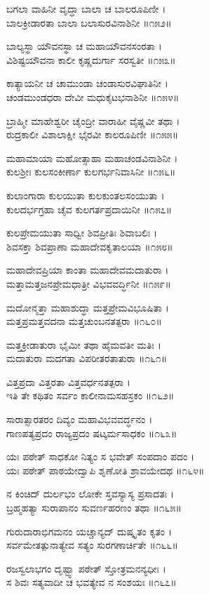 ಬಗಲಾ ವಾಹಿನೀ ವೃದ್ಧಾ ಬಾಲಾ ಚ ಬಾಲರೂಪಿಣೀ ।\\
ಬಾಲಕ್ರೀಡಾರತಾ ಬಾಲಾ ಬಲಾಸುರವಿನಾಶಿನೀ ॥೧೫೨॥

ಬಾಲ್ಯಸ್ಥಾ ಯೌವನಸ್ಥಾ ಚ ಮಹಾಯೌವನಸಂರತಾ ।\\
ವಿಶಿಷ್ಟಯೌವನಾ ಕಾಲೀ ಕೃಷ್ಣದುರ್ಗಾ ಸರಸ್ವತೀ ॥೧೫೩॥

ಕಾತ್ಯಾಯನೀ ಚ ಚಾಮುಂಡಾ ಚಂಡಾಸುರವಿಘಾತಿನೀ ।\\
ಚಂಡಮುಂಡಧರಾ ದೇವೀ ಮಧುಕೈಟಭನಾಶಿನೀ ॥೧೫೪॥

ಬ್ರಾಹ್ಮೀ ಮಾಹೇಶ್ವರೀ ಚೈಂದ್ರೀ ವಾರಾಹೀ ವೈಷ್ಣವೀ ತಥಾ ।\\
ರುದ್ರಕಾಲೀ ವಿಶಾಲಾಕ್ಷೀ ಭೈರವೀ ಕಾಲರೂಪಿಣೀ ॥೧೫೫॥

ಮಹಾಮಾಯಾ ಮಹೋತ್ಸಾಹಾ ಮಹಾಚಂಡವಿನಾಶಿನೀ ।\\
ಕುಲಶ್ರೀಃ ಕುಲಸಂಕೀರ್ಣಾ ಕುಲಗರ್ಭನಿವಾಸಿನೀ ॥೧೫೬॥

ಕುಲಾಂಗಾರಾ ಕುಲಯುತಾ ಕುಲಕುಂತಲಸಂಯುತಾ ।\\
ಕುಲದರ್ಭಗ್ರಹಾ ಚೈವ ಕುಲಗರ್ತಪ್ರದಾಯಿನೀ ॥೧೫೭॥

ಕುಲಪ್ರೇಮಯುತಾ ಸಾಧ್ವೀ ಶಿವಪ್ರೀತಿಃ ಶಿವಾಬಲಿಃ ।\\
ಶಿವಸಕ್ತಾ ಶಿವಪ್ರಾಣಾ ಮಹಾದೇವಕೃತಾಲಯಾ ॥೧೫೮॥

ಮಹಾದೇವಪ್ರಿಯಾ ಕಾಂತಾ ಮಹಾದೇವಮದಾತುರಾ ।\\
ಮತ್ತಾಮತ್ತಜನಪ್ರೇಮಧಾತ್ರೀ ವಿಭವವರ್ದ್ಧಿನೀ ॥೧೫೯॥

ಮದೋನ್ಮತ್ತಾ ಮಹಾಶುದ್ಧಾ ಮತ್ತಪ್ರೇಮವಿಭೂಷಿತಾ ।\\
ಮತ್ತಪ್ರಮತ್ತವದನಾ ಮತ್ತಚುಂಬನತತ್ಪರಾ ॥೧೬೦॥

ಮತ್ತಕ್ರೀಡಾತುರಾ ಭೈಮೀ ತಥಾ ಹೈಮವತೀ ಮತಿಃ ।\\
ಮದಾತುರಾ ಮದಗತಾ ವಿಪರೀತರತಾತುರಾ ॥೧೬೧॥

ವಿತ್ತಪ್ರದಾ ವಿತ್ತರತಾ ವಿತ್ತವರ್ಧನತತ್ಪರಾ ।\\
ಇತಿ ತೇ ಕಥಿತಂ ಸರ್ವಂ ಕಾಲೀನಾಮಸಹಸ್ರಕಂ ॥೧೬೨॥

ಸಾರಾತ್ಸಾರತರಂ ದಿವ್ಯಂ ಮಹಾವಿಭವವರ್ದ್ಧನಂ ।\\
ಗಾಣಪತ್ಯಪ್ರದಂ ರಾಜ್ಯಪ್ರದಂ ಷಟ್ಕರ್ಮಸಾಧಕಂ ॥೧೬೩॥

ಯಃ ಪಠೇತ್ ಸಾಧಕೋ ನಿತ್ಯಂ ಸ ಭವೇತ್ ಸಂಪದಾಂ ಪದಂ ।\\
ಯಃ ಪಠೇತ್ ಪಾಠಯೇದ್ವಾಪಿ ಶೃಣೋತಿ ಶ್ರಾವಯೇದಥ ॥೧೬೪॥

ನ ಕಿಂಚಿದ್ ದುರ್ಲಭಂ ಲೋಕೇ ಸ್ತವಸ್ಯಾಸ್ಯ ಪ್ರಸಾದತಃ ।\\
ಬ್ರಹ್ಮಹತ್ಯಾ ಸುರಾಪಾನಂ ಸುವರ್ಣಹರಣಂ ತಥಾ ॥೧೬೫॥

ಗುರುದಾರಾಭಿಗಮನಂ ಯಚ್ಚಾನ್ಯದ್ ದುಷ್ಕೃತಂ ಕೃತಂ ।\\
ಸರ್ವಮೇತತ್ಪುನಾತ್ಯೇವ ಸತ್ಯಂ ಸುರಗಣಾರ್ಚಿತೇ ॥೧೬೬॥

ರಜಸ್ವಲಾಭಗಂ ದೃಷ್ಟ್ವಾ ಪಠೇತ್ ಸ್ತೋತ್ರಮನನ್ಯಧೀಃ ।\\
ಸ ಶಿವಃ ಸತ್ಯವಾದೀ ಚ ಭವತ್ಯೇವ ನ ಸಂಶಯಃ ॥೧೬೭॥

